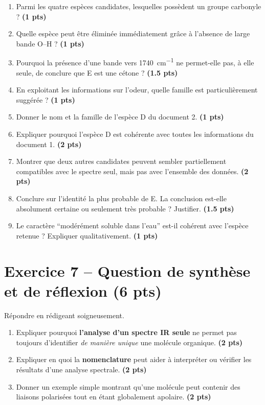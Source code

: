 \documentclass[11pt,a4paper]{article}
\newcommand{\pts}[1]{\hfill{\small\textbf{(#1 pts)}}}
\begin{document}
\begin{enumerate}[label=\textbf{\arabic*.},leftmargin=1.2em]
    \item Parmi les quatre espèces candidates, lesquelles possèdent un groupe carbonyle ? \pts{1}
    \item Quelle espèce peut être éliminée immédiatement grâce à l'absence de large bande O--H ? \pts{1}
    \item Pourquoi la présence d'une bande vers \SI{1740}{cm^{-1}} ne permet-elle pas, à elle seule, de conclure que E est une cétone ? \pts{1.5}
    \item En exploitant les informations sur l'odeur, quelle famille est particulièrement suggérée ? \pts{1}
    \item Donner le nom et la famille de l'espèce D du document 2. \pts{1}
    \item Expliquer pourquoi l'espèce D est cohérente avec toutes les informations du document 1. \pts{2}
    \item Montrer que deux autres candidates peuvent sembler partiellement compatibles avec le spectre seul, mais pas avec l'ensemble des données. \pts{2}
    \item Conclure sur l'identité la plus probable de E. La conclusion est-elle absolument certaine ou seulement très probable ? Justifier. \pts{1.5}
    \item Le caractère ``modérément soluble dans l'eau'' est-il cohérent avec l'espèce retenue ? Expliquer qualitativement. \pts{1}
\end{enumerate}

\section*{Exercice 7 -- Question de synthèse et de réflexion \pts{6}}

Répondre en rédigeant soigneusement.

\begin{enumerate}[label=\textbf{\arabic*.},leftmargin=1.2em]
    \item Expliquer pourquoi \textbf{l'analyse d'un spectre IR seule} ne permet pas toujours d'identifier \emph{de manière unique} une molécule organique. \pts{2}
    \item Expliquer en quoi la \textbf{nomenclature} peut aider à interpréter ou vérifier les résultats d'une analyse spectrale. \pts{2}
    \item Donner un exemple simple montrant qu'une molécule peut contenir des liaisons polarisées tout en étant globalement apolaire. \pts{2}
\end{enumerate}
\end{document}
